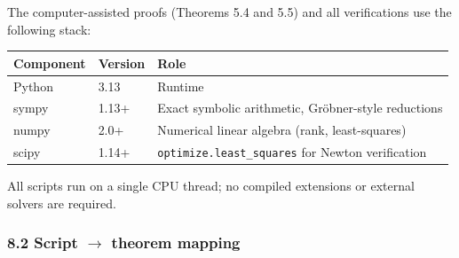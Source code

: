 \documentclass[
]{article}
\begin{document}
The computer-assisted proofs (Theorems 5.4 and 5.5) and all
verifications use the following stack:

\begin{longtable}[]{@{}lll@{}}
\toprule\noalign{}
Component & Version & Role \\
\midrule\noalign{}
\endhead
\bottomrule\noalign{}
\endlastfoot
Python & 3.13 & Runtime \\
sympy & 1.13+ & Exact symbolic arithmetic, Gröbner-style reductions \\
numpy & 2.0+ & Numerical linear algebra (rank, least-squares) \\
scipy & 1.14+ & \texttt{optimize.least\_squares} for Newton
verification \\
\end{longtable}

All scripts run on a single CPU thread; no compiled extensions or
external solvers are required.

\subsubsection{\texorpdfstring{8.2 Script \(\to\) theorem
mapping}{8.2 Script \textbackslash to theorem mapping}}\label{script-to-theorem-mapping}
\end{document}
